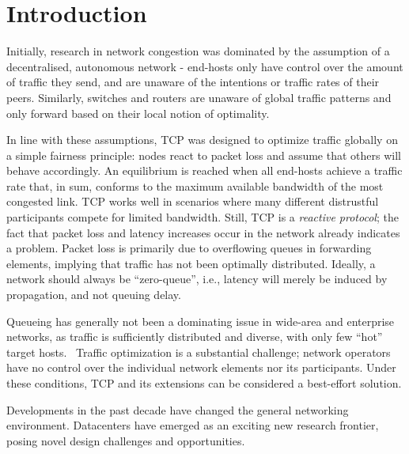 \section{Introduction}
\label{sec:intro}

Initially, research in network congestion was dominated by the assumption of a decentralised, autonomous network - end-hosts only have control over the amount of traffic they send, and are unaware of the intentions or traffic rates of their peers. Similarly, switches and routers are unaware of global traffic patterns and only forward based on their local notion of optimality.

In line with these assumptions, TCP was designed to optimize traffic globally on a simple fairness principle: nodes react to packet loss and assume that others will behave accordingly. An equilibrium is reached when all end-hosts achieve a traffic rate that, in sum, conforms to the maximum available bandwidth of the most congested link.
TCP works well  in scenarios where many different distrustful participants compete for limited bandwidth. Still, TCP is a \textit{reactive protocol}; the fact that packet loss and latency increases occur in the network already indicates a problem. Packet loss is primarily due to overflowing queues in forwarding elements, implying that traffic has not been optimally distributed. Ideally, a network should always be “zero-queue”, i.e., latency will merely be induced by propagation, and not queuing delay. 

Queueing has generally not been a dominating issue in wide-area and enterprise networks, as traffic is sufficiently distributed and diverse, with only few “hot” target hosts.~\cite{hedera, microte} Traffic optimization is a substantial challenge; network operators have no control over the individual network elements nor its participants. Under these conditions, TCP and its extensions can be considered a best-effort solution.

Developments in the past decade have changed the general networking environment. Datacenters have emerged as an exciting new research frontier, posing novel design challenges and opportunities.


